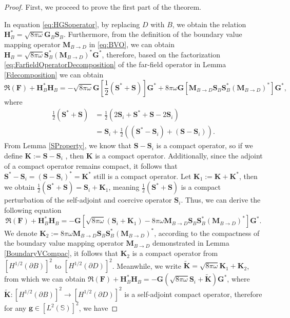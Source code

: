 \documentclass[11pt,reqno,twoside]{amsart}
\theoremstyle{definition}
\theoremstyle{remark}
\numberwithin{equation}{section}
\begin{document}
\begin{proof}
First, we proceed to prove the first part of the theorem.

In equation \eqref{eq:HGSoperator}, by replacing $D$ with $B$, we obtain the relation $\mathbf H^*_B=\sqrt{8\pi\omega}\mathbf G_B \mathbf S_B$. Furthermore, from the definition of the boundary value mapping operator $\mathbf M_{B \to D}$ in \eqref{eq:BVO}, we can obtain $ \mathbf H_B= \sqrt{8\pi\omega}\mathbf S^*_B \left( \mathbf M_{B \to D} \right) ^* \mathbf G^*$, therefore, based on the factorization \eqref{eq:FarfieldOperatorDecomposition} of the far-field operator in Lemma \ref{Fdecomposition}  we can obtain
$$
\Re\left( \mathbf F\right)+\mathbf H^*_B\mathbf H_B = -\sqrt{8\pi\omega}\mathbf G \left[ \frac{1}{2}\left( \mathbf S^*+\mathbf S\right) \right] \mathbf G^*+ 8\pi\omega\mathbf G \left[\mathbf M_{B \to D}\mathbf S_B\mathbf S^*_B\left( \mathbf M_{B \to D}\right) ^*\right] \mathbf G^*,
$$
where
\begin{equation}\begin{aligned}
\frac{1}{2}\left( \mathbf S^*+\mathbf S\right) 
&= \frac{1}{2}\left( 2\mathbf S_{i}+\mathbf S^*+\mathbf S-2\mathbf S_{i}\right)\\
&= \mathbf S_{i} + \frac{1}{2}\left( \left( \mathbf S^*-\mathbf S_{i}\right) +\left( \mathbf S-\mathbf S_{i}\right) \right) .
\end{aligned}\end{equation}
From Lemma \ref{SProperty}, we know that $\mathbf S-\mathbf S_i$ is a compact operator, so if we define $\mathbf K:= \mathbf S-\mathbf S_{i}$ , then $\mathbf K$ is a compact operator. Additionally, since the adjoint of a compact operator remains compact, it follows that $\mathbf S^*-\mathbf S_{i}=\left(\mathbf S-\mathbf S_{i}\right) ^*=\mathbf K^*$ still is a compact operator. Let $\mathbf K_1:=\mathbf K +\mathbf K^*$, then we obtain $\frac{1}{2}\left( \mathbf S^*+\mathbf S\right)=\mathbf S_{i} +\mathbf K_1$, meaning $\frac{1}{2}\left( \mathbf S^*+\mathbf S\right)$ is a compact perturbation of the self-adjoint and coercive operator $\mathbf S_{i}$. Thus, we can derive the following equation
$$
\Re\left( \mathbf F\right)+\mathbf H^*_B\mathbf H_B = -\mathbf G \left[\sqrt{8\pi\omega}\left( \mathbf S_{i} +\mathbf K_1 \right)-8\pi\omega \mathbf M_{B \to D}\mathbf S_B\mathbf S^*_B\left( \mathbf M_{B \to D}\right) ^*\right]\mathbf G^*.
$$
We denote $\mathbf K_2:=8\pi\omega \mathbf M_{B \to D}\mathbf S_B\mathbf S^*_B\left( \mathbf M_{B \to D}\right) ^*$, according to the compactness of the boundary value mapping operator $\mathbf M_{B \to D}$ demonstrated in Lemma \ref{BoundaryVCompac}, it follows that $\mathbf K_2$ is a compact operator from $ \left[H^{1/2}\left(\partial B \right) \right]^2 $ to $\left[H^{1/2}\left(\partial D \right) \right]^2$. Meanwhile, we write $\mathbf{\tilde{K}}=\sqrt{8\pi\omega} \mathbf K_1+\mathbf K_2$, from which we can obtain $\Re\left( \mathbf F\right)+\mathbf H^*_B\mathbf H_B = -\mathbf G \left( \sqrt{8\pi\omega} \mathbf S_{i}+\mathbf{\tilde{K}} \right) \mathbf G^*$, where $\mathbf{\tilde{K}}:\left[H^{1/2}\left(\partial B \right) \right]^2  \to \left[H^{1/2}\left(\partial D \right) \right]^2$ is a self-adjoint compact operator, therefore for any $\mathbf g \in \left[L^{2}\left(\mathbb S \right) \right]^2$, we have

\end{proof}
\end{document}
